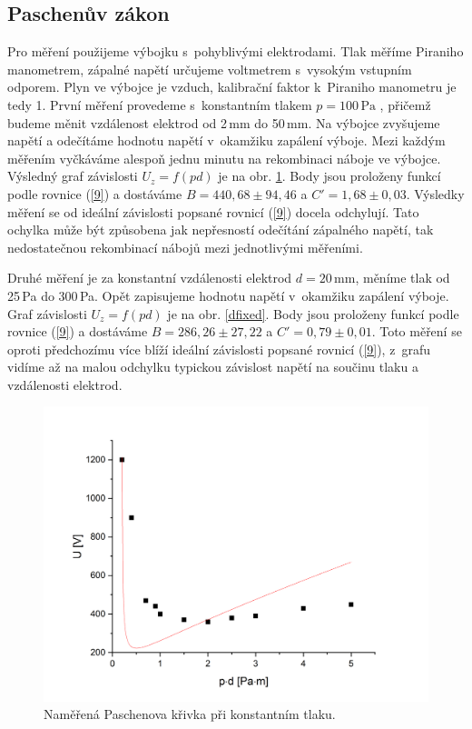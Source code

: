 \documentclass[a4paper,12pt]{article}
\begin{document}
\subsection{Paschenův zákon}
Pro měření použijeme výbojku s~pohyblivými elektrodami. Tlak měříme Piraniho manometrem, zápalné napětí určujeme voltmetrem s~vysokým vstupním odporem. Plyn ve výbojce je vzduch, kalibrační faktor k~Piraniho manometru je tedy 1. První měření provedeme s~konstantním tlakem $p = 100\,\si{\pascal}$ , přičemž budeme měnit vzdálenost elektrod od 2\,\si{\milli\meter} do 50\,\si{\milli\meter}. Na výbojce zvyšujeme napětí a odečítáme hodnotu napětí v~okamžiku zapálení výboje. Mezi každým měřením vyčkáváme alespoň jednu minutu na rekombinaci náboje ve výbojce. Výsledný graf závislosti $U_z = f(pd)$ je na obr. \ref{tlakfixed}. Body jsou proloženy funkcí podle rovnice (\ref{9}) a dostáváme $B = 440,68 \pm 94,46$ a $C' = 1,68 \pm 0,03$. Výsledky měření se od ideální závislosti popsané rovnicí (\ref{9}) docela odchylují. Tato ochylka může být způsobena jak nepřesností odečítání zápalného napětí, tak nedostatečnou rekombinací nábojů mezi jednotlivými měřeními. 

Druhé měření je za konstantní vzdálenosti elektrod $d = 20\,\si{\milli\meter}$, měníme tlak od 25\,\si{\pascal} do 300\,\si{\pascal}. Opět zapisujeme hodnotu napětí v~okamžiku zapálení výboje. Graf závislosti $U_z = f(pd)$ je na obr. \ref{dfixed}. Body jsou proloženy funkcí podle rovnice (\ref{9}) a dostáváme $B = 286,26 \pm 27,22$ a $C' = 0,79 \pm 0,01$. Toto měření se oproti předchozímu více blíží ideální závislosti popsané rovnicí (\ref{9}), z~grafu vidíme až na malou odchylku typickou závislost napětí na součinu tlaku a vzdálenosti elektrod.


\begin{figure}[h]
	\centering
	\includegraphics[width=130mm]{tlakfixed.png}
	\caption{Naměřená Paschenova křivka při konstantním tlaku.}
	\label{tlakfixed}
\end{figure}
\end{document}
